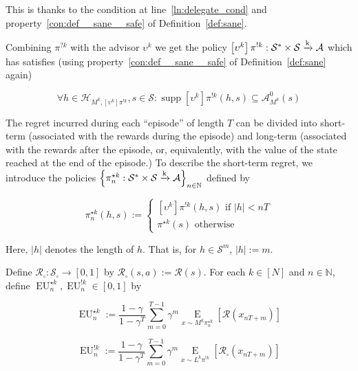\documentclass[anon,12pt]{colt2018} %
\DeclareMathOperator{\Supp}{supp}
\newcommand{\AP}[1]{\left(#1\right)}
\newcommand{\AB}[1]{\left[#1\right]}
\newcommand{\AC}[1]{\left\{#1\right\}}
\newcommand{\Ea}[2]{\underset{#1}{\operatorname{E}}\AB{#2}}
\newcommand{\Nats}{\mathbb{N}}
\newcommand{\Abs}[1]{\left\vert #1 \right\vert}
\newcommand{\K}{\xrightarrow{\textnormal{k}}}
\newcommand{\A}{\mathcal{A}}
\newcommand{\St}{\mathcal{S}}
\newcommand{\R}{\mathcal{R}}
\newcommand{\EU}{\operatorname{EU}}
\newcommand{\MP}[2]{#1#2}
\newcommand{\AdP}[2]{\AB{#1}#2}
\newcommand{\Ad}{\upsilon}
\newcommand{\FH}{\mathcal{H}}
\newcommand{\IP}{\pi^{!k}}
\begin{document}

This is thanks to the condition at line~\ref{ln:delegate_cond} and property~\ref{con:def__sane__safe} of Definition~\ref{def:sane}.

Combining $\pi^{?k}$ with the advisor $\Ad^k$ we get the policy $\AdP{\Ad^k}{\IP}: \St^*\times\St\K\A$ which has satisfies (using property~\ref{con:def__sane__safe} of Definition~\ref{def:sane} again)

\begin{equation}
\label{eqn:imaginary_safety}
\forall h\in\FH_{M^k,\AdP{\Ad^k}{\IP}},s\in\St: \Supp{\AdP{\Ad^k}{\IP}(h,s)} \subseteq \A_{M^k}^0(s)
\end{equation}

The regret incurred during each \enquote{episode} of length $T$ can be divided into short-term (associated with the rewards during the episode) and long-term (associated with the rewards after the episode, or, equivalently, with the value of the state reached at the end of the episode.) To describe the short-term regret, we introduce the policies $\AC{\pi_n^{\star k}: \St^* \times \St \K \A}_{n \in \Nats}$ defined by

\begin{equation}
\pi_n^{\star k}(h,s):=\begin{cases} \AdP{\Ad^k}{\IP}(h,s) \text{ if } \Abs{h} < nT \\ \pi^{\star k}(s) \text{ otherwise} \end{cases}
\end{equation}

Here, $\Abs{h}$ denotes the length of $h$. That is, for $h \in \St^m$, $\Abs{h}:=m$.

Define $\R_\square: \St_\square \rightarrow [0,1]$ by $\R_\square(s,a):=\R(s)$. For each $k\in[N]$ and $n\in\Nats$, define $\EU_n^{\star k},\EU_n^{!k}\in[0,1]$ by

\begin{equation}
\label{eqn:eustar}
\EU_n^{\star k}:=\frac{1-\gamma}{1-\gamma^T}\sum_{m=0}^{T-1} \gamma^m \Ea{x\sim{\MP{M^k}{\pi_n^{\star  k}}}}{\R\AP{x_{nT+m}}}
\end{equation}

\begin{equation}
\label{eqn:eushriek}
\EU_n^{!k}:=\frac{1-\gamma}{1-\gamma^T}\sum_{m=0}^{T-1} \gamma^m \Ea{x\sim{\MP{L^k}{\IP}}}{\R_\square\AP{x_{nT+m}}}
\end{equation}
\end{document}
